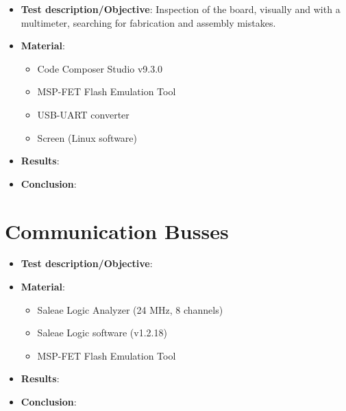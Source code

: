 \begin{itemize}
    \item \textbf{Test description/Objective}: Inspection of the board, visually and with a multimeter, searching for fabrication and assembly mistakes.
    \item \textbf{Material}:
        \begin{itemize}
            \item Code Composer Studio v9.3.0
            \item MSP-FET Flash Emulation Tool
            \item USB-UART converter
            \item Screen (Linux software)
        \end{itemize}
    \item \textbf{Results}: %
    \item \textbf{Conclusion}: %
\end{itemize}


\section{Communication Busses}

\begin{itemize}
    \item \textbf{Test description/Objective}: %
    \item \textbf{Material}:
        \begin{itemize}
            \item Saleae Logic Analyzer (24 MHz, 8 channels)
            \item Saleae Logic software (v1.2.18)
            \item MSP-FET Flash Emulation Tool
        \end{itemize}
    \item \textbf{Results}: %
    \item \textbf{Conclusion}: %
\end{itemize}

